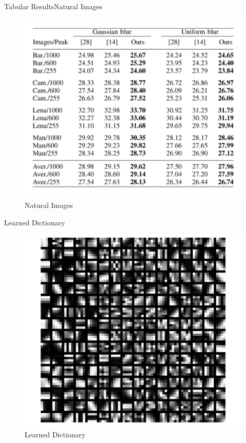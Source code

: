 \documentclass{beamer}
\begin{document}
\begin{frame}{Tabular Results}{Natural Images}
    \begin{figure}
        \centering
        \includegraphics[scale=0.45]{table_result.png}
        \caption{Natural Images}
    \end{figure}
\end{frame}

\begin{frame}{Learned Dictionary}
\begin{figure}
    \centering
    \includegraphics[scale=0.5]{Dictionary_Medical}
    \caption{Learned Dictionary}
    \label{fig:my_label}
\end{figure}
    
\end{frame}
\end{document}
